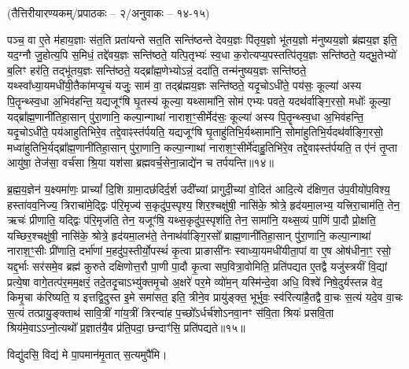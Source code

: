\vspace{-1ex}
\centerline{\scriptsize(तैत्तिरीयारण्यकम्/प्रपाठकः – २/अनुवाकः – १४-१५)}
{\normalsize
पञ्च॒ वा ए॒ते म॑हाय॒ज्ञाः स॑त॒ति प्रता॑यन्ते सत॒ति सन्ति॑ष्ठन्ते देवय॒ज्ञः पि॑तृय॒ज्ञो भू॑तय॒ज्ञो म॑नुष्यय॒ज्ञो ब्र॑ह्मय॒ज्ञ इति॒ यद॒ग्नौ जु॒होत्य॒पि स॒मिधं॒ तद्दे॑वय॒ज्ञः सन्ति॑ष्ठते॒ यत्पि॒तृभ्यः॑ स्व॒धा क॒रोत्यप्य॒पस्तत्पि॑तृय॒ज्ञः सन्ति॑ष्ठते॒ यद्भू॒तेभ्यो॑ ब॒लिꣳ हर॑ति॒ तद्भू॑तय॒ज्ञः सन्ति॑ष्ठते॒ यद्ब्रा᳚ह्म॒णेभ्योऽन्नं॒ ददा॑ति॒ तन्म॑नुष्यय॒ज्ञः सन्ति॑ष्ठते॒ यथ्स्वा᳚ध्या॒यमधी॑यी॒तैका॑मप्यृ॒चं यजुः॒ साम॑ वा॒ तद्ब्र॑ह्मय॒ज्ञः सन्ति॑ष्ठते॒ यदृ॒चोऽधी॑ते॒ पय॑सः॒ कूल्या॑ अस्य पि॒तॄन्थ्स्व॒धा अ॒भिव॑हन्ति॒ यद्यजूꣳ॑षि घृ॒तस्य॑ कूल्या॒ यथ्सामा॑नि॒ सोम॑ एभ्यः पवते॒ यदथ॑र्वाङ्गि॒रसो॒ मधोः᳚ कूल्या॒ यद्ब्रा᳚ह्म॒णानी॑तिहा॒सान् पु॑रा॒णानि॒ कल्पा॒न्गाथा॑ नाराश॒ꣳ॒सीर्मेद॑सः॒ कूल्या॑ अस्य पि॒तॄन्थ्स्व॒धा अ॒भिव॑हन्ति॒ यदृ॒चोऽधी॑ते॒ पय॑आहुतिभिरे॒व तद्दे॒वाꣴस्त॑र्पयति॒ यद्यजूꣳ॑षि घृ॒ताहु॑तिभि॒र्यथ्सामा॑नि॒ सोमा॑हुतिभि॒र्यदथ॑र्वाङ्गि॒रसो॒ मध्वा॑\-हुतिभि॒र्यद्ब्रा᳚ह्म॒णानी॑तिहा॒सान् पु॑रा॒णानि॒ कल्पा॒न्गाथा॑ नाराश॒ꣳ॒सीर्मे॑दाहु॒तिभि॑रे॒व तद्दे॒वाꣴस्त॑र्पयति॒ त ए॑नं तृ॒प्ता आयु॑षा॒ तेज॑सा॒ वर्च॑सा श्रि॒या यश॑सा ब्रह्मवर्च॒सेना॒न्नाद्ये॑न च तर्पयन्ति॥१४॥

ब्र॒ह्म॒य॒ज्ञेन॑ य॒क्ष्यमा॑णः॒ प्राच्यां᳚ दि॒शि ग्रामा॒दछ॑दिर्द॒र्\mbox{}श उदी᳚च्यां प्रागुदी॒च्यां वो॒दित॑ आदि॒त्ये द॑क्षिण॒त उ॑प॒वीयो॑प॒विश्य॒ हस्ता॑वव॒निज्य॒ त्रिराचा॑मे॒द्द्विः प॑रि॒मृज्य॑ स॒कृदु॑प॒स्पृश्य॒ शिर॒श्चक्षु॑षी॒ नासि॑के॒ श्रोत्रे॒ हृद॑यमा॒लभ्य॒ यत्त्रिरा॒चाम॑ति॒ तेन॒ ऋचः॑ प्रीणाति॒ यद्द्विः प॑रि॒मृज॑ति॒ तेन॒ यजूꣳ॑षि॒ यथ्स॒कृदु॑प॒स्पृश॑ति॒ तेन॒ सामा॑नि॒ यथ्स॒व्यं पा॒णिं पा॒दौ प्रो॒क्षति॒ यच्छिर॒श्चक्षु॑षी॒ नासि॑के॒ श्रोत्रे॒ हृद॑यमा॒लभ॑ते॒ तेनाथ॑र्वाङ्गि॒रसो᳚ ब्राह्म॒णानी॑तिहा॒सान् पु॑रा॒णानि॒ कल्पा॒न्गाथा॑ नाराश॒ꣳ॒सीः प्री॑णाति॒ दर्भा॑णां म॒हदु॑प॒स्तीर्यो॒पस्थं॑ कृ॒त्वा प्राङासी॑नः स्वाध्या॒यमधी॑यीता॒पां वा ए॒ष ओष॑धीना॒ꣳ॒ रसो॒ यद्द॒र्भाः सर॑समे॒व ब्रह्म॑ कुरुते दक्षिणोत्त॒रौ पा॒णी पा॒दौ कृ॒त्वा सप॒वित्रा॒वोमिति॒ प्रति॑पद्यत ए॒तद्वै यजु॑स्त्रयीं वि॒द्यां प्रत्ये॒षा वागे॒तत्प॑र॒मम॒क्षरं॒ तदे॒तदृ॒चाऽभ्यु॑क्तमृ॒चो अ॒क्षरे॑ पर॒मे व्यो॑म॒न् यस्मि॑न्दे॒वा अधि॒ विश्वे॑ निषे॒दुर्यस्तन्न वेद॒ किमृ॒चा क॑रिष्यति॒ य इत्तद्वि॒दुस्त इ॒मे समा॑सत॒ इति॒ त्रीने॒व प्रायु॑ङ्क्त॒ भूर्भुवः॒ स्व॑रित्या॑है॒तद्वै वा॒चः स॒त्यं यदे॒व वा॒चः स॒त्यं तत्प्रायु॒ङ्क्ताथ॑ सावि॒त्रीं गा॑य॒त्रीं त्रिरन्वा॑ह प॒च्छो᳚ऽर्धर्च॑शोऽनवा॒नꣳ स॑वि॒ता श्रियः॑ प्रसवि॒ता श्रिय॑मे॒वाऽऽप्नो॒त्यथो᳚ प्र॒ज्ञात॑यै॒व प्र॑ति॒पदा॒ छन्दाꣳ॑सि॒ प्रति॑पद्यते॥१५॥


}

विद्यु॑दसि॒ विद्य॑ मे पा॒पमान॑मृ॒तात् स॒त्यमुपै॑मि।

